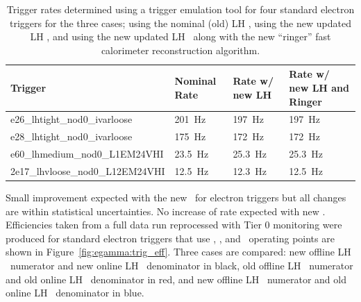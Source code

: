 \begin{table}[h]
\footnotesize
\renewcommand{\arraystretch}{1.16}
\begin{center}
  \begin{tabular}{|l|l|l|l|}
\hline
\textbf{Trigger} & \textbf{Nominal Rate} & \textbf{Rate w/ new LH} & \textbf{Rate w/ new LH and Ringer} \\
\hline
e26\_lhtight\_nod0\_ivarloose & 201~Hz & 197~Hz & 197~Hz \\
\hline
e28\_lhtight\_nod0\_ivarloose & 175~Hz & 172~Hz & 172~Hz \\
\hline
e60\_lhmedium\_nod0\_L1EM24VHI & 23.5~Hz & 25.3~Hz & 25.3~Hz \\
\hline
2e17\_lhvloose\_nod0\_L12EM24VHI & 12.5~Hz & 12.3~Hz & 12.5~Hz \\
\hline
\end{tabular}
\end{center}
  \caption{Trigger rates determined using a trigger emulation tool for four standard electron triggers for the three cases; using the nominal (old) LH \tune, using the new updated LH \tune, and using the new updated LH \tune\ along with the new ``ringer'' fast calorimeter reconstruction algorithm.}
\label{tab:trig_rates}
\end{table}
Small improvement expected with the new \tune\ for electron
triggers but all changes are within statistical uncertainties.
No increase of rate expected with new \tune.
Efficiencies taken from a full data run reprocessed with Tier 0 monitoring were produced for standard electron triggers that use \Tight, \Medium, and \VeryLoose\ operating points are shown in Figure~\ref{fig:egamma:trig_eff}.
Three cases are compared: new offline LH \tune\ numerator and new online LH \tune\ denominator in black, old offline LH \tune\ numerator and old online LH \tune\ denominator in red, and new offline LH \tune\ numerator and old online LH \tune\ denominator in blue.


